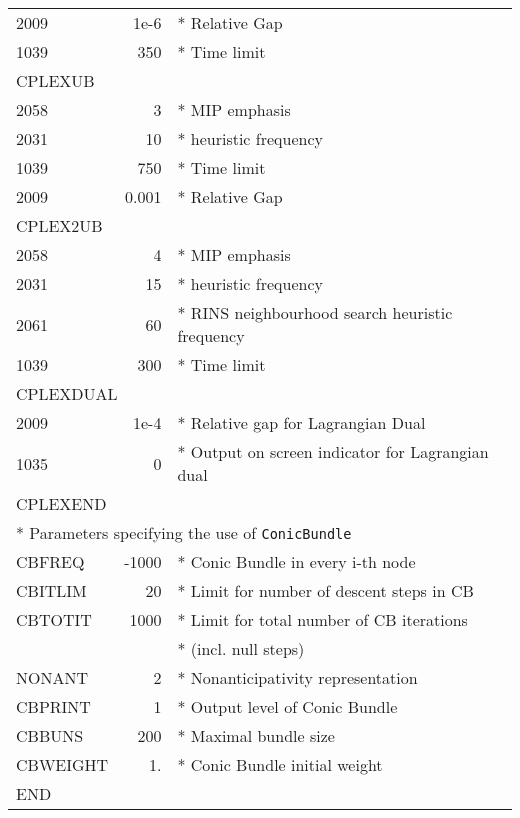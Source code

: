 \documentclass[11pt,draft]{article}
\newcommand{\+}{{\ti{+}}}
\newcommand{\1}{{\ti{1}}}
\begin{document}
\begin{appendix}
\begin{center}
{\begin{tabular}{lrl}
2009 & 1e-6&* Relative Gap\\
1039 &  350&* Time limit\\
\multicolumn{3}{l}{CPLEXUB}\\
2058 &    3&* MIP emphasis\\
2031 &   10&* heuristic frequency\\
1039 &  750&* Time limit\\
2009 &0.001&* Relative Gap\\
\multicolumn{3}{l}{CPLEX2UB}\\
2058 &    4&* MIP emphasis\\
2031 &   15&* heuristic frequency\\
2061 &   60&* RINS neighbourhood search heuristic frequency\\
1039 &  300&* Time limit\\
\multicolumn{3}{l}{CPLEXDUAL}\\
2009       &      1e-4 & * Relative gap for Lagrangian Dual\\
1035       &        0 & * Output on screen indicator for Lagrangian dual\\
\multicolumn{3}{l}{CPLEXEND}\medskip\\
\multicolumn{3}{l}{*  Parameters specifying the use of \texttt{ConicBundle}}\medskip\\
CBFREQ &          -1000 &* Conic Bundle in every i-th node\\
CBITLIM&             20 &* Limit for number of descent steps in CB\\
CBTOTIT&           1000 &* Limit for total number of CB iterations\\&& * (incl. null steps)\\
NONANT       &        2 &* Nonanticipativity representation\\
CBPRINT&              1 &* Output level of Conic Bundle\\
CBBUNS&              200&* Maximal bundle size\\
CBWEIGHT&             1.&* Conic Bundle initial weight\\
END&&\\
\end{tabular}}
\vspace{2ex}


\end{center}
\end{appendix}
\end{document}
